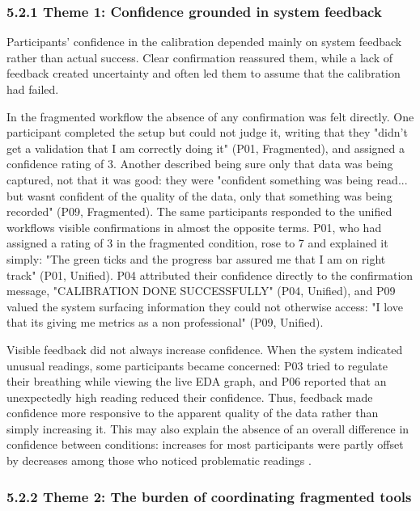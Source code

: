 \documentclass[
]{article}
\begin{document}
\hypertarget{theme-1-confidence-grounded-in-system-feedback}{%
\subsubsection{\texorpdfstring{5.2.1 Theme 1: Confidence grounded in system feedback }{5.2.1 Theme 1: Confidence grounded in system feedback }}\label{theme-1-confidence-grounded-in-system-feedback}}

Participants' confidence in the calibration depended mainly on system feedback rather than actual success. Clear confirmation reassured them, while a lack of feedback created uncertainty and often led them to assume that the calibration had failed.

In the fragmented workflow the absence of any confirmation was felt directly. One participant completed the setup but could not judge it, writing that they "didn't get a validation that I am correctly doing it" (P01, Fragmented), and assigned a confidence rating of 3. Another described being sure only that data was being captured, not that it was good: they were "confident something was being read... but wasn\textquotesingle t confident of the quality of the data, only that something was being recorded" (P09, Fragmented). The same participants responded to the unified workflow\textquotesingle s visible confirmations in almost the opposite terms. P01, who had assigned a rating of 3 in the fragmented condition, rose to 7 and explained it simply: "The green ticks and the progress bar assured me that I am on right track" (P01, Unified). P04 attributed their confidence directly to the confirmation message, "CALIBRATION DONE SUCCESSFULLY" (P04, Unified), and P09 valued the system surfacing information they could not otherwise access: "I love that it\textquotesingle s giving me metrics as a non professional" (P09, Unified).

Visible feedback did not always increase confidence. When the system indicated unusual readings, some participants became concerned: P03 tried to regulate their breathing while viewing the live EDA graph, and P06 reported that an unexpectedly high reading reduced their confidence. Thus, feedback made confidence more responsive to the apparent quality of the data rather than simply increasing it. This may also explain the absence of an overall difference in confidence between conditions: increases for most participants were partly offset by decreases among those who noticed problematic readings .

\hypertarget{theme-2-the-burden-of-coordinating-fragmented-tools}{%
\subsubsection{\texorpdfstring{5.2.2 Theme 2: The burden of coordinating fragmented tools }{5.2.2 Theme 2: The burden of coordinating fragmented tools }}\label{theme-2-the-burden-of-coordinating-fragmented-tools}}
\end{document}
